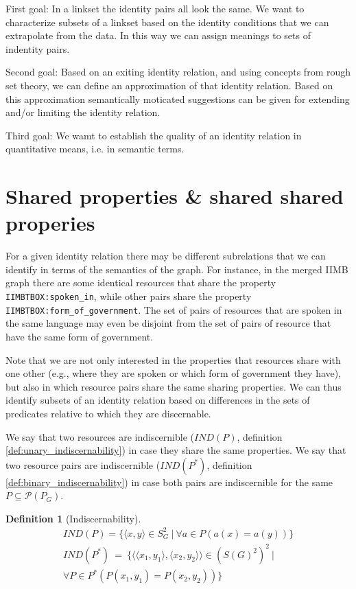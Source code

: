\documentclass[letterpaper]{article}
\newtheorem{definition}{Definition}
\begin{document}
First goal: In a linkset the identity pairs all look the same. We want to characterize subsets of a linkset based on the identity conditions that we can extrapolate from the data. In this way we can assign meanings to sets of indentity pairs.

Second goal: Based on an exiting identity relation, and using concepts from rough set theory, we can define an approximation of that identity relation. Based on this approximation semantically moticated suggestions can be given for extending and/or limiting the identity relation.

Third goal: We wamt to establish the quality of an identity relation in quantitative means, i.e. in semantic terms.

\section{Shared properties \& shared shared properies}

For a given identity relation there may be different subrelations that we can identify in terms of the semantics of the graph. For instance, in the merged IIMB graph there are some identical resources that share the property \verb|IIMBTBOX:spoken_in|, while other pairs share the property \verb|IIMBTBOX:form_of_government|. The set of pairs of resources that are spoken in the same language may even be disjoint from the set of pairs of resource that have the same form of government.

Note that we are not only interested in the properties that resources share with one other (e.g., where they are spoken or which form of government they have), but also in which resource pairs share the same sharing properties. We can thus identify subsets of an identity relation based on differences in the sets of predicates relative to which they are discernable.

We say that two resources are indiscernible ($IND(P)$, definition \ref{def:unary_indiscernability}) in case they share the same properties. We say that two resource pairs are indiscernible ($IND(P^*)$, definition \ref{def:binary_indiscernability}) in case both pairs are indiscernible for the same $P \subseteq \mathcal{P}(P_G)$.

\begin{definition}[Indiscernability]
\begin{align}
IND(P) = \{
  \langle x, y \rangle \in S_G^2
\  \vert \ 
  \forall a \in P(a(x) = a(y))
\}
\label{def:unary_indiscernability}
\\
IND(P^*) \  = \  \{
    \langle
      \langle x_1, y_1 \rangle,
      \langle x_2, y_2 \rangle
    \rangle \in (S(G)^2)^2
  \  \vert \ 
\\
    \forall P \in P^*(P(x_1, y_1) = P(x_2, y_2))
  \}
\label{def:binary_indiscernability}
\end{align}
\end{definition}
\end{document}
